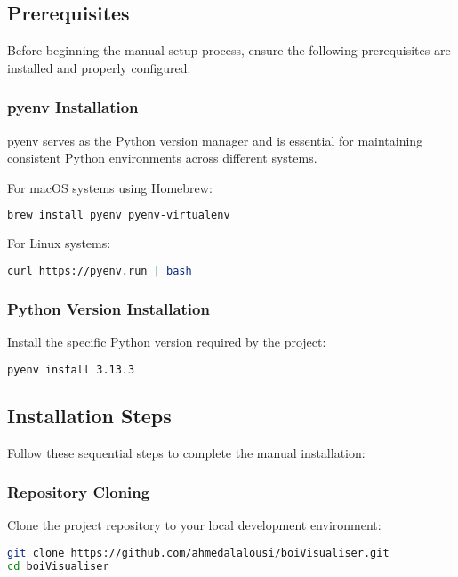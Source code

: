 \documentclass[11pt,a4paper]{article}
\begin{document}
\subsection{Prerequisites}

Before beginning the manual setup process, ensure the following prerequisites are installed and properly configured:

\subsubsection{pyenv Installation}

pyenv serves as the Python version manager and is essential for maintaining consistent Python environments across different systems.

For macOS systems using Homebrew:
\begin{lstlisting}[language=bash]
brew install pyenv pyenv-virtualenv
\end{lstlisting}

For Linux systems:
\begin{lstlisting}[language=bash]
curl https://pyenv.run | bash
\end{lstlisting}

\subsubsection{Python Version Installation}

Install the specific Python version required by the project:
\begin{lstlisting}[language=bash]
pyenv install 3.13.3
\end{lstlisting}

\subsection{Installation Steps}

Follow these sequential steps to complete the manual installation:

\subsubsection{Repository Cloning}

Clone the project repository to your local development environment:
\begin{lstlisting}[language=bash]
git clone https://github.com/ahmedalalousi/boiVisualiser.git
cd boiVisualiser
\end{lstlisting}
\end{document}
